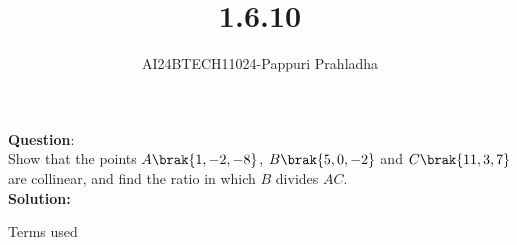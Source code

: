 \documentclass[journal]{IEEEtran}
\begin{document}

\vspace{3cm}

\title{1.6.10}
\author{AI24BTECH11024-Pappuri Prahladha}
{\let\newpage\relax\maketitle}

\renewcommand{\thefigure}{\theenumi}
\renewcommand{\thetable}{\theenumi}
\setlength{\intextsep}{10pt} %


\renewcommand{\thetable}{\theenumi}


\textbf{Question}:\\
Show that the points $A\brak{1, -2, -8}$, $B\brak{5,0,-2}$ and $C\brak{11,3,7}$ are collinear, and find the ratio in which $B$ divides $AC$.
\\
\textbf{Solution: }
\begin{table}[h!]
    \renewcommand{\thetable}{1}
    \centering
    
    \caption{Terms used}
    \label{TABLE 1:}
\end{table}
\end{document}
